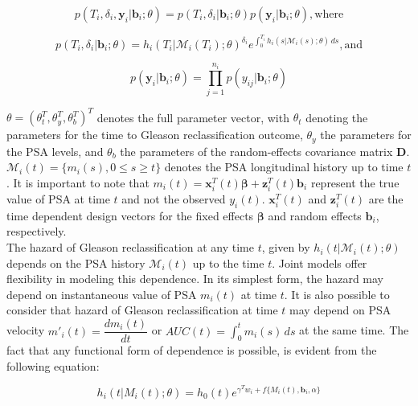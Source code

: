 \begin{equation}
p(T_i, \delta_i, \boldsymbol{y}_i | \boldsymbol{b}_i; \theta) = p(T_i, \delta_i | \boldsymbol{b}_i; \theta) p(\boldsymbol{y}_i | \boldsymbol{b}_i; \theta), \text{where}
\end{equation}

\begin{equation}
p(T_i, \delta_i | \boldsymbol{b}_i; \theta) = h_i(T_i|\mathcal{M}_i(T_i); \theta)^{\delta_i} e^{\int_0^{T_i} h_i(s|\mathcal{M}_i(s); \theta) \,ds}, \text{and}
\end{equation}

\begin{equation}
p(\boldsymbol{y}_i | \boldsymbol{b}_i; \theta) = \prod_{j=1}^{n_i} p(y_{ij} | \boldsymbol{b}_i; \theta)
\end{equation}

$\theta = (\theta_t^T, \theta_y^T, \theta_b^T)^T$ denotes the full parameter vector, with $\theta_t$ denoting the parameters for the time to Gleason reclassification outcome, $\theta_y$ the parameters for the PSA levels, and $\theta_b$ the parameters of the random-effects covariance matrix $\boldsymbol{D}$. $\mathcal{M}_i(t) = \{m_i(s), 0\leq s \geq t\}$ denotes the PSA longitudinal history up to time $t$. It is important to note that $m_i(t) = \boldsymbol{x}_i^T(t)\boldsymbol{\beta} + \boldsymbol{z}_i^T(t) \boldsymbol{b}_i$ represent the true value of PSA at time $t$ and not the observed $y_i(t)$. $\boldsymbol{x}_i^T(t)$ and $\boldsymbol{z}_i^T(t)$ are the time dependent design vectors for the fixed effects $\boldsymbol{\beta}$ and random effects $\boldsymbol{b}_i$, respectively.\\ 

The hazard of Gleason reclassification
at any time $t$, given by $h_i(t|\mathcal{M}_i(t);\theta)$ depends on the PSA history $\mathcal{M}_i(t)$ up to the time $t$. Joint models offer flexibility in modeling this dependence. In its simplest form, the hazard may depend on instantaneous value of PSA $m_i(t)$ at time $t$. It is also possible to consider that hazard of Gleason reclassification at time $t$ may depend on PSA velocity $m'_i(t) = \dfrac{d m_i(t)}{dt}$ or $AUC(t) = \int_0^t m_i(s) \,ds$ at the same time. The fact that any functional form of dependence is possible, is evident from the following equation:

\begin{equation}
h_i(t|M_i(t); \theta) = h_0(t) e^{\gamma^Tw_i + f\{M_i(t), \boldsymbol{b}_i, \alpha\}}
\end{equation}

